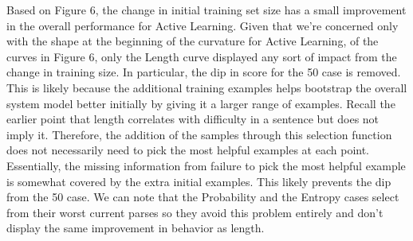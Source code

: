 \documentclass{article} %
\begin{document}
Based on Figure 6, the change in initial training set size has a small improvement in the overall performance for Active Learning. Given that we're concerned only with the shape at the beginning of the curvature for Active Learning, of the curves in Figure 6, only the Length curve displayed any sort of impact from the change in training size. In particular, the dip in score for the 50 case is removed. This is likely because the additional training examples helps bootstrap the overall system model better initially by giving it a larger range of examples. Recall the earlier point that length correlates with difficulty in a sentence but does not imply it. Therefore, the addition of the samples through this selection function does not necessarily need to pick the most helpful examples at each point. Essentially, the missing information from failure to pick the most helpful example is somewhat covered by the extra initial examples. This likely prevents the dip from the 50 case. We can note that the Probability and the Entropy cases select from their worst current parses so they avoid this problem entirely and don't display the same improvement in behavior as length.
\end{document}
